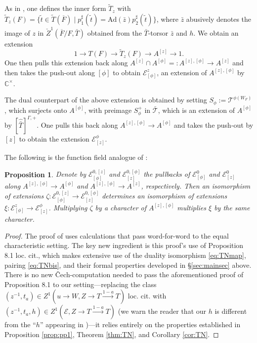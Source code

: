 \documentclass{amsart}
\newtheorem{proposition}[result]{Proposition}
\theoremstyle{definition}
\theoremstyle{remark}
\newcommand{\ov}{\overline}
\begin{document}
As in \cite[\S 3.2]{Kal26b}, one defines the inner form $\tilde{T}_{z}$ with $\tilde{T}_{z}(F) = \{\tilde{t} \in \tilde{T}(\ov{F}) \mid p_{1}^{\sharp}(\tilde{t})=\text{Ad}(\bar{z})p_{2}^{\sharp}(\tilde{t}) \}$, where $\bar{z}$ abusively denotes the image of $z$ in $\check{Z}^{1}(\ov{F}/F,\bar{T})$ obtained from the $\bar{T}$-torsor $\bar{z}$ and $h$. We obtain an extension
\begin{equation*}
1 \to T(F) \to \tilde{T}_{z}(F) \to A^{[z]} \to 1. \end{equation*}
One then pulls this extension back along $A^{[z]} \cap A^{[\phi]}=:A^{[z],[\phi]} \to A^{[z]}$ and then takes the push-out along $[\phi]$ to obtain $\mathcal{E}^{z}_{[\phi]}$, an extension of $A^{[z],[\phi]}$ by $\mathbb{C}^{\times}$.

The dual counterpart of the above extension is obtained by setting $S_{\phi} := \mathcal{T}^{\phi(W_{F})}$, which surjects onto $A^{[\phi]}$, with preimage $S_{\phi}^{+}$ in $\bar{\mathcal{T}}$, which is an extension of $A^{[\phi]}$ by $[\widehat{\bar{T}}]^{\Gamma,+}$. One pulls this back along $A^{[z],[\phi]} \to A^{[\phi]}$ and takes the push-out by $[z]$ to obtain the extension $\mathcal{E}_{[z]}^{\phi}$.

The following is the function field analogue of \cite[Proposition 8.2]{Kal26b}:

\begin{proposition}\label{prop:prop8.2}
  Denote by $\mathcal{E}_{[\phi]}^{0,[z]}$ and $\mathcal{E}_{[z]}^{0,[\phi]}$ the pullbacks of $\mathcal{E}_{[\phi]}^{0}$ and $\mathcal{E}_{[z]}^{0}$ along $A^{[z],[\phi]} \to A^{[\phi]}$ and $A^{[z],[\phi]} \to A^{[z]}$, respectively. Then an isomorphism of extensions $\zeta \colon \mathcal{E}_{[\phi]}^{0,[z]} \to \mathcal{E}_{[z]}^{0,[\phi]}$ determines an isomorphism of extensions $\xi \colon \mathcal{E}^{z}_{[\phi]} \to \mathcal{E}_{[z]}^{\phi}$. Multiplying $\zeta$ by a character of $A^{[z],[\phi]}$ multiplies $\xi$ by the same character.
\end{proposition}

\begin{proof}
    The proof of \cite[Proposition 8.2]{Kal26b} uses calculations that pass word-for-word to the equal characteristic setting. The key new ingredient is this proof's use of Proposition 8.1 loc. cit., which makes extensive use of the duality isomorphism \eqref{eq:TNmap}, pairing \eqref{eq:TNbis}, and their formal properties developed in \S \ref{sec:mainsec} above. There is no new \v{C}ech-computation needed to pass the aforementioned proof of Proposition 8.1 to our setting---replacing the class $(z^{-1},t_{a}) \in Z^{1}(u \to W, Z \to T \xrightarrow{1-a} T)$ loc. cit. with $(z^{-1},t_{a},h) \in Z^{1}(\mathcal{E}, Z \to T \xrightarrow{1-a} T)$ (we warn the reader that our $h$ is different from the ``$h$'' appearing in \cite[\S 8.2]{Kal26b})---it relies entirely on the properties established in Proposition \ref{prop:pp1}, Theorem \ref{thm:TN}, and Corollary \ref{cor:TN}.
\end{proof}
\end{document}
